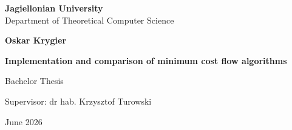 \begin{titlepage}
	\begin{center}
        
		\large
		\textbf{Jagiellonian University}\\
		Department of Theoretical Computer Science\\

		\vspace{1.5cm}

		\Large
		\textbf{Oskar Krygier}

		\vspace*{2cm}

		\textbf{\LARGE Implementation and comparison of minimum cost flow algorithms}
		
		\vspace{0.5cm}
		\large
		
		\vfill
		\Large
		Bachelor Thesis

		\vfill
		\Large
		Supervisor: dr hab. Krzysztof Turowski
		
		\vspace{0.8cm}
		
		June 2026
		
\end{center}
\end{titlepage}